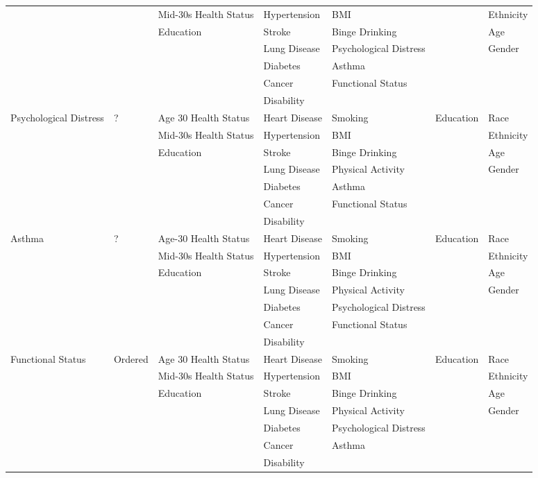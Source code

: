 \begin{table}
\begin{tiny}
\begin{tabular}{lllllll}
 & & Mid-30s Health Status & Hypertension & BMI & & Ethnicity \\
  & & Education & Stroke & Binge Drinking & & Age \\
  &  & & Lung Disease & Psychological Distress & & Gender \\
   &  & & Diabetes & Asthma & & \\
   &   & & Cancer & Functional Status & & \\
   &   & & Disability & &  & \\
\midrule
Psychological Distress & ? & Age 30 Health Status & Heart Disease & Smoking & Education & Race \\
 & & Mid-30s Health Status & Hypertension & BMI & & Ethnicity \\
 &  & Education & Stroke & Binge Drinking & & Age \\
   & & & Lung Disease & Physical Activity & & Gender \\
    & & & Diabetes & Asthma & & \\
     & & & Cancer & Functional Status & & \\
     & & & Disability & & & \\
\midrule
Asthma & ? & Age-30 Health Status & Heart Disease & Smoking & Education & Race \\
 & & Mid-30s Health Status & Hypertension & BMI & & Ethnicity \\
  & & Education & Stroke & Binge Drinking & & Age \\
   & & & Lung Disease & Physical Activity & & Gender \\
    & & & Diabetes & Psychological Distress & & \\
    &  & & Cancer & Functional Status & & \\
    &  & & Disability & & & \\
\midrule
Functional Status & Ordered & Age 30 Health Status & Heart Disease & Smoking & Education & Race \\
 & & Mid-30s Health Status & Hypertension & BMI & & Ethnicity \\
 &  & Education & Stroke & Binge Drinking & & Age \\
  &  & & Lung Disease & Physical Activity & & Gender \\
  &   & & Diabetes & Psychological Distress & & \\
   &   & & Cancer & Asthma & & \\
   &   & & Disability & & & \\
\bottomrule
\end{tabular}
\end{tiny}
\end{table}


